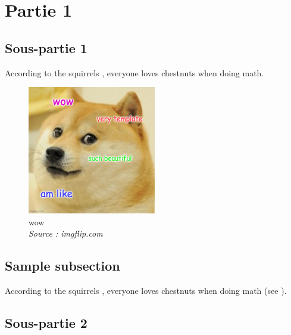 \section{Partie 1}

\subsection{Sous-partie 1}

According to the squirrels \cite{einstein}, everyone loves chestnuts when doing \gls{math}.

\lipsum

\begin{figure}[h]
	\centering
    \includegraphics[width=0.5\textwidth]{images/example.jpg}
	\caption{wow\\\emph{Source : imgflip.com}}
	\label{fig:wow}
\end{figure}

\subsection{Sample subsection}

According to the squirrels \cite{einstein}, everyone loves chestnuts when doing
\gls{math} (see ).


\subsection{Sous-partie 2}

\lipsum